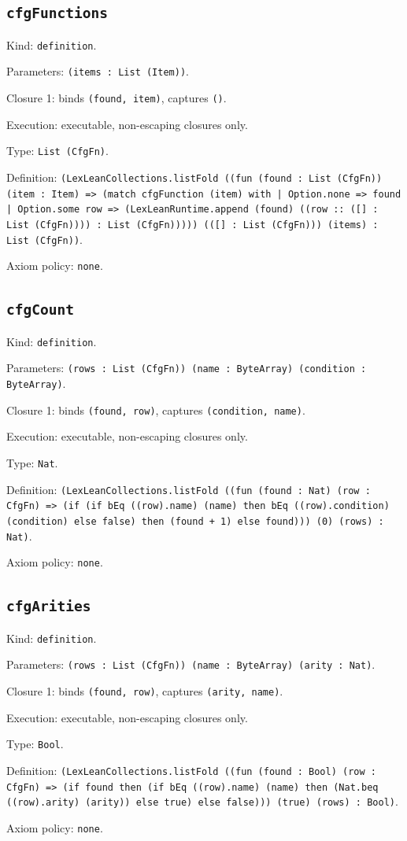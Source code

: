 \documentclass[11pt]{article}
\begin{document}
\subsection*{\texttt{cfgFunctions}}
\noindent Kind: \texttt{definition}.\par
\noindent Parameters: \texttt{(items : List (Item))}.\par
\noindent Closure 1: binds \texttt{(found, item)}, captures \texttt{()}.\par
\noindent Execution: executable, non-escaping closures only.\par
\noindent Type: \texttt{List (CfgFn)}.\par
\noindent Definition: \texttt{(LexLeanCollections.listFold ((fun (found : List (CfgFn)) (item : Item) => (match cfgFunction (item) with | Option.none => found | Option.some row => (LexLeanRuntime.append (found) ((row :: ([] : List (CfgFn)))) : List (CfgFn))))) (([] : List (CfgFn))) (items) : List (CfgFn))}.\par
\noindent Axiom policy: \texttt{none}.\par
\subsection*{\texttt{cfgCount}}
\noindent Kind: \texttt{definition}.\par
\noindent Parameters: \texttt{(rows : List (CfgFn)) (name : ByteArray) (condition : ByteArray)}.\par
\noindent Closure 1: binds \texttt{(found, row)}, captures \texttt{(condition, name)}.\par
\noindent Execution: executable, non-escaping closures only.\par
\noindent Type: \texttt{Nat}.\par
\noindent Definition: \texttt{(LexLeanCollections.listFold ((fun (found : Nat) (row : CfgFn) => (if (if bEq ((row).name) (name) then bEq ((row).condition) (condition) else false) then (found + 1) else found))) (0) (rows) : Nat)}.\par
\noindent Axiom policy: \texttt{none}.\par
\subsection*{\texttt{cfgArities}}
\noindent Kind: \texttt{definition}.\par
\noindent Parameters: \texttt{(rows : List (CfgFn)) (name : ByteArray) (arity : Nat)}.\par
\noindent Closure 1: binds \texttt{(found, row)}, captures \texttt{(arity, name)}.\par
\noindent Execution: executable, non-escaping closures only.\par
\noindent Type: \texttt{Bool}.\par
\noindent Definition: \texttt{(LexLeanCollections.listFold ((fun (found : Bool) (row : CfgFn) => (if found then (if bEq ((row).name) (name) then (Nat.beq ((row).arity) (arity)) else true) else false))) (true) (rows) : Bool)}.\par
\noindent Axiom policy: \texttt{none}.\par
\end{document}

